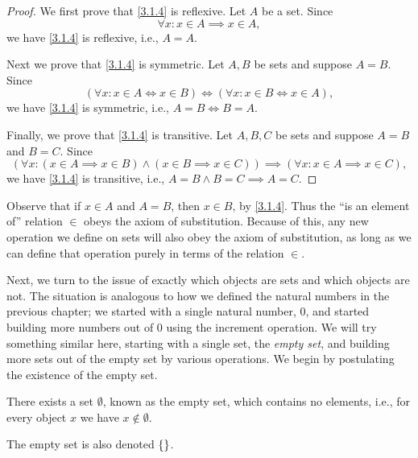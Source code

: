\begin{proof}
	We first prove that \cref{3.1.4} is reflexive.
	Let \(A\) be a set.
	Since
	\[
		\forall x : x \in A \implies x \in A,
	\]
	we have \cref{3.1.4} is reflexive, i.e., \(A = A\).

	Next we prove that \cref{3.1.4} is symmetric.
	Let \(A, B\) be sets and suppose \(A = B\).
	Since
	\[
		(\forall x : x \in A \iff x \in B) \iff (\forall x : x \in B \iff x \in A),
	\]
	we have \cref{3.1.4} is symmetric, i.e., \(A = B \iff B = A\).

	Finally, we prove that \cref{3.1.4} is transitive.
	Let \(A, B, C\) be sets and suppose \(A = B\) and \(B = C\).
	Since
	\[
		(\forall x : (x \in A \implies x \in B) \land (x \in B \implies x \in C)) \implies (\forall x : x \in A \implies x \in C),
	\]
	we have \cref{3.1.4} is transitive, i.e., \(A = B \land B = C \implies A = C\).
\end{proof}

\begin{note}
	Observe that if \(x \in A\) and \(A = B\), then \(x \in B\), by \cref{3.1.4}.
	Thus the ``is an element of'' relation \(\in\) obeys the axiom of substitution.
	Because of this, any new operation we define on sets will also obey the axiom of substitution, as long as we can define that operation purely in terms of the relation \(\in\).
\end{note}

\begin{note}
	Next, we turn to the issue of exactly which objects are sets and which objects are not.
	The situation is analogous to how we defined the natural numbers in the previous chapter;
	we started with a single natural number, \(0\), and started building more numbers out of \(0\) using the increment operation.
	We will try something similar here, starting with a single set, the \emph{empty set},
	and building more sets out of the empty set by various operations.
	We begin by postulating the existence of the empty set.
\end{note}

\begin{ax}\label{3.2}
	There exists a set \(\emptyset\), known as the empty set, which contains no elements, i.e., for every object \(x\) we have \(x \notin \emptyset\).
\end{ax}

\begin{note}
	The empty set is also denoted \(\left\lbrace\right\rbrace\).
\end{note}

